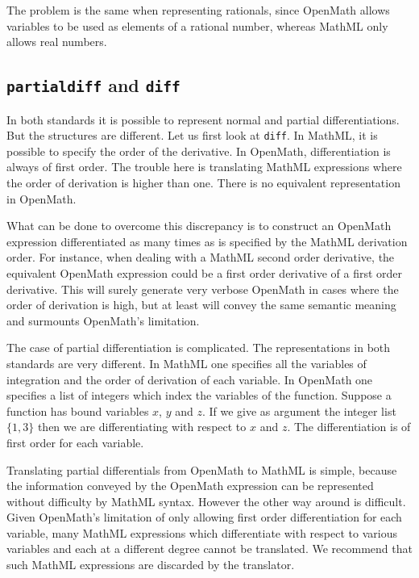 The problem is the same when representing rationals, since OpenMath
allows variables to be used as elements of a rational number, whereas
MathML only allows real numbers.

\subsection{{\tt partialdiff} and {\tt diff}}

In both standards it is possible to represent normal and partial
differentiations. But the structures are different. Let us first look
at {\tt diff}. In MathML, it is possible to specify the order of the
derivative. In OpenMath, differentiation is always of first order.  
The trouble here is translating MathML expressions where the order of
derivation is higher than one. There is no equivalent representation in
OpenMath.

What can be done to overcome this discrepancy is to construct an
OpenMath expression differentiated as many times as is specified by the
MathML derivation order. For instance, when dealing with a MathML
second order derivative, the equivalent OpenMath expression could be a
first order derivative of a first order derivative.  This will surely
generate very verbose OpenMath in cases where the order of derivation
is high, but at least will convey the same semantic meaning and
surmounts OpenMath's limitation.

The case of partial differentiation is complicated. The representations
in both standards are very different. In MathML one specifies all the
variables of integration and the order of derivation of each variable.
In OpenMath one specifies a list of integers which index the variables
of the function. Suppose a function has bound variables $x$, $y$ and
$z$. If we give as argument the integer list $\{1,3\}$ then we are
differentiating with respect to $x$ and $z$. The differentiation is of
first order for each variable.

Translating partial differentials from OpenMath to MathML is simple,
because the information conveyed by the OpenMath expression can be
represented without difficulty by MathML syntax. However the other way
around is difficult. Given OpenMath's limitation of only allowing first
order differentiation for each variable, many MathML expressions which
differentiate with respect to various variables and each at a different
degree cannot be translated. We recommend that such MathML expressions
are discarded by the translator.

